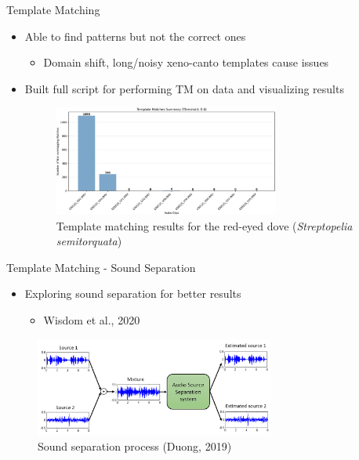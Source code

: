 \begin{frame}{Template Matching}
    \begin{itemize}
        \item Able to find patterns but not the correct ones
            \begin{itemize}
                \item Domain shift, long/noisy xeno-canto templates cause issues
            \end{itemize}
        \item Built full script for performing TM on data and visualizing results
        \begin{figure}
            \centering
            \includegraphics[height=0.7\textheight,width=0.7\textwidth,keepaspectratio]{images/template_matching.png}
            \caption{Template matching results for the red-eyed dove (\textit{Streptopelia semitorquata})}
        \end{figure}
    \end{itemize}
\end{frame}

\begin{frame}{Template Matching - Sound Separation}
    \begin{itemize}
        \item Exploring sound separation for better results
            \begin{itemize}
                \item Wisdom et al., 2020
            \end{itemize}
    \end{itemize}
    \begin{figure}
        \centering
        \includegraphics[height=0.7\textheight,width=0.7\textwidth,keepaspectratio]{images/sound_separation.png}
        \caption{Sound separation process (Duong, 2019)}
    \end{figure}
\end{frame}


